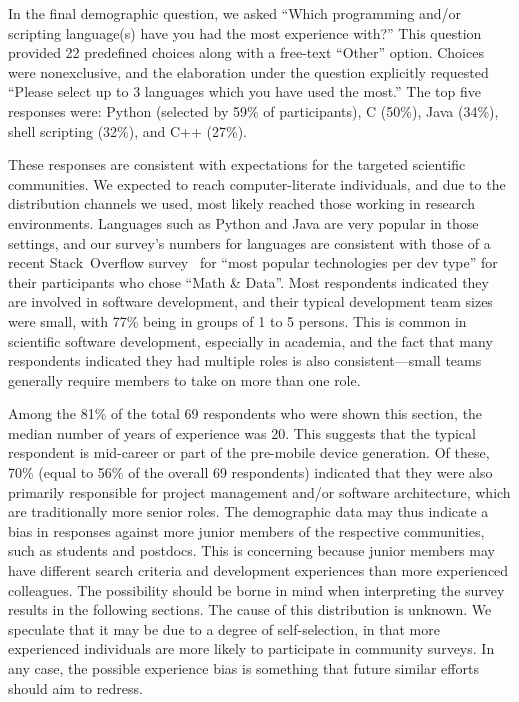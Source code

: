 \documentclass{casicswhitepaper}
\newcommand{\totalRespondents}{69\xspace}
\begin{document}
In the final demographic question, we asked ``Which programming and/or scripting language(s) have you had the most experience with?''  This question provided 22 predefined choices along with a free-text ``Other'' option.  Choices were nonexclusive, and the elaboration under the question explicitly requested ``Please select up to 3 languages which you have used the most.''   The top five responses were: Python (selected by 59\% of participants), C (50\%), Java (34\%), shell scripting (32\%), and C++ (27\%).

These responses are consistent with expectations for the targeted scientific communities.  We expected to reach computer-literate individuals, and due to the distribution channels we used, most likely reached those working in research environments.  Languages such as Python and Java are very popular in those settings, and our survey's numbers for languages are consistent with those of a recent Stack~Overflow survey~\cite{stackexchange2016survey} for ``most popular technologies per dev type'' for their participants who chose ``Math \& Data''.  Most respondents indicated they are involved in software development, and their typical development team sizes were small, with 77\% being in groups of 1 to 5 persons.  This is common in scientific software development, especially in academia, and the fact that many respondents indicated they had multiple roles is also consistent---small teams generally require members to take on more than one role.


Among the 81\% of the total \totalRespondents respondents who were shown this section, the median number of years of experience was 20. This suggests that the typical respondent is mid-career or part of the pre-mobile device generation.  Of these, 70\% (equal to 56\% of the overall \totalRespondents respondents) indicated that they were also primarily responsible for project management and/or software architecture, which are traditionally more senior roles.  The demographic data may thus indicate a bias in responses against more junior members of the respective communities, such as students and postdocs.  This is concerning because junior members may have different search criteria and development experiences than more experienced colleagues. The possibility should be borne in mind when interpreting the survey results in the following sections. The cause of this distribution is unknown.  We speculate that it may be due to a degree of self-selection, in that more experienced individuals are more likely to participate in community surveys.  In any case, the possible experience bias is something that future similar efforts should aim to redress.
\end{document}
